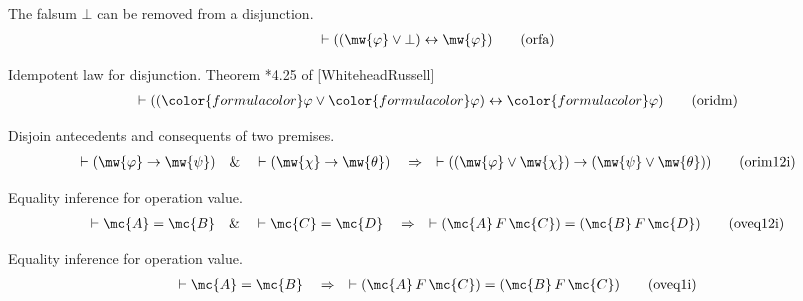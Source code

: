\begin{lemma} {The falsum $\bot$ can be removed from a
disjunction.}  
\begin{align}
\vdash ( ( \mw{\varphi} \vee \bot ) \leftrightarrow \mw{\varphi}
    )\label{eq:orfa}\tag{orfa}
\end{align}
\end{lemma}


\begin{lemma} {Idempotent law for disjunction.}  Theorem *4.25
of [WhiteheadRussell]
\begin{align}
\vdash ( ( {\color{formulacolor}\varphi} \vee {\color{formulacolor}\varphi} )
    \leftrightarrow {\color{formulacolor}\varphi} )\label{eq:oridm}\tag{oridm}
\end{align}
\end{lemma}


\begin{lemma} {Disjoin antecedents and consequents of two
premises.}  
\begin{align}
\vdash ( \mw{\varphi} \rightarrow \mw{\psi} )\quad\&\quad \vdash ( \mw{\chi}
    \rightarrow \mw{\theta} )\quad\Rightarrow\quad \vdash ( ( \mw{\varphi} \vee
    \mw{\chi} ) \rightarrow ( \mw{\psi} \vee \mw{\theta} )
    )\label{eq:orim12i}\tag{orim12i}
\end{align}
\end{lemma}


\begin{lemma} {Equality inference for operation value.} 
\begin{align}
\vdash \mc{A} = \mc{B} \quad\&\quad \vdash \mc{C} = \mc{D} \quad\Rightarrow\quad \vdash ( \mc{A} \,F \,\mc{C} )
    = ( \mc{B} \,F \,\mc{D} )\label{eq:oveq12i}\tag{oveq12i}
\end{align}
\end{lemma}


\begin{lemma} {Equality inference for operation value.} 
\begin{align}
\vdash \mc{A} = \mc{B} \quad\Rightarrow\quad \vdash ( \mc{A} \,F \,\mc{C} ) = ( \mc{B} \,F \,\mc{C}
    )\label{eq:oveq1i}\tag{oveq1i}
\end{align}
\end{lemma}


